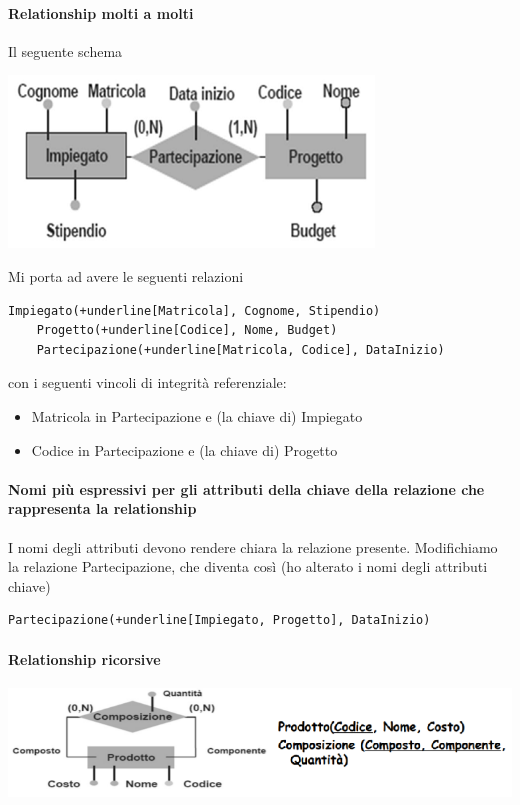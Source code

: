 \paragraph{Relationship molti a molti} Il seguente schema
\begin{center}
	\includegraphics{images/122.PNG}
\end{center}
Mi porta ad avere le seguenti relazioni
\begin{Verbatim}[commandchars=+\[\]]
	Impiegato(+underline[Matricola], Cognome, Stipendio)
	Progetto(+underline[Codice], Nome, Budget)
	Partecipazione(+underline[Matricola, Codice], DataInizio)
\end{Verbatim}
con i seguenti vincoli di integrità referenziale:
\begin{itemize}
	\item Matricola in Partecipazione e (la chiave di) Impiegato
	\item Codice in Partecipazione e (la chiave di) Progetto
\end{itemize}
\paragraph{Nomi più espressivi per gli attributi della chiave della relazione che rappresenta la relationship} I nomi degli attributi devono rendere chiara la relazione presente. Modifichiamo la relazione Partecipazione, che diventa così (ho alterato i nomi degli attributi chiave)
\begin{Verbatim}[commandchars=+\[\]]
	Partecipazione(+underline[Impiegato, Progetto], DataInizio)
\end{Verbatim}
\paragraph{Relationship ricorsive}
\begin{center}
	\includegraphics{images/123.PNG}
\end{center}
